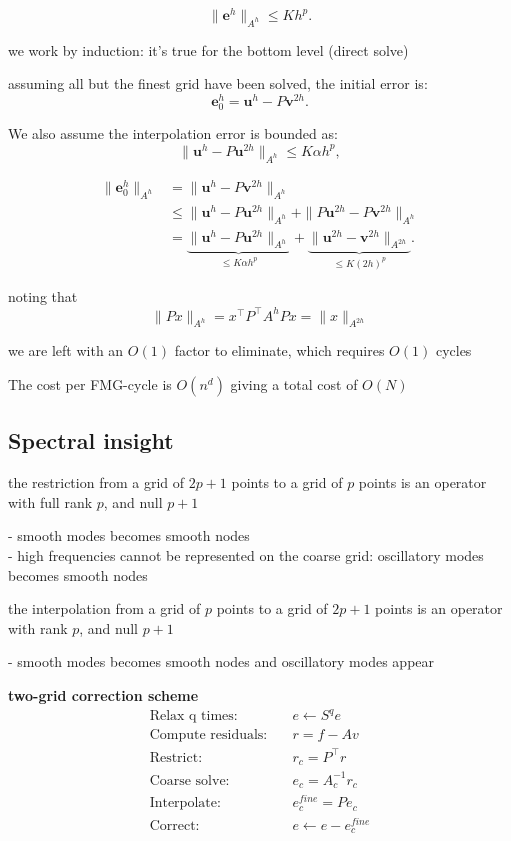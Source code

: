 \documentclass{article}
\begin{document}
\[
    \|\mathbf{e}^{h}\|_{A^{h}} \le Kh^{p}.
\]

we work by induction: it's true for the bottom level (direct solve)

assuming all but the finest grid have been solved, the initial error is:
\[
    \mathbf{e}_0^h = \mathbf{u}^h - P \mathbf{v}^{2h}.
\]

We also assume the interpolation error is bounded as: %
\[
    \|\mathbf{u}^h - P \mathbf{u}^{2h}\|_{A^h} \le K\alpha h^p,
\]

\begin{align*}
    \|\mathbf{e}_0^h\|_{A^h} &= \|\mathbf{u}^h - P \mathbf{v}^{2h}\|_{A^h} \\
    &\le \|\mathbf{u}^h - P \mathbf{u}^{2h}\|_{A^h} + \|P \mathbf{u}^{2h} - P \mathbf{v}^{2h}\|_{A^h}  \\
    &= \underbrace{\|\mathbf{u}^h - P \mathbf{u}^{2h}\|_{A^h}}_{\le K\alpha h^p} + \underbrace{\|\mathbf{u}^{2h} - \mathbf{v}^{2h}\|_{A^{2h}}}_{\le K{(2h)}^p}.
\end{align*}

noting that
\[
    \| Px \|_{A^h} = x^{\top} P^{\top} A^h P x = \| x \|_{A^{2h}}
\]

we are left with an $O(1)$ factor to eliminate, which requires $O(1)$ cycles

The cost per FMG-cycle is $O(n^{d})$ giving a total cost of $ O(N)$

\subsection{Spectral insight}

the restriction from a grid of $2p + 1$ points to a grid of $p$ points is an operator with full rank $p$, and null $p+1$

- smooth modes becomes smooth nodes \\ 
- high frequencies cannot be represented on the coarse grid: oscillatory modes becomes smooth nodes


the interpolation from a grid of $p$ points to a grid of $2p + 1$ points is an operator with rank $p$, and null $p+1$

- smooth modes becomes smooth nodes and oscillatory modes appear


\textbf{two-grid correction scheme}
\begin{align*}
    \text{Relax q times:}      \quad & e \leftarrow S^{q}e \\
    \text{Compute residuals:}  \quad & r = f - Av \\
    \text{Restrict:}           \quad & r_{c} = P^{\top}r \\
    \text{Coarse solve:}       \quad & e_{c} = A_{c}^{-1}r_{c} \\
    \text{Interpolate:}        \quad & e_{c}^{fine} = Pe_{c} \\
    \text{Correct:}            \quad & e \leftarrow e - e_{c}^{fine} \\ 
\end{align*}
\end{document}

